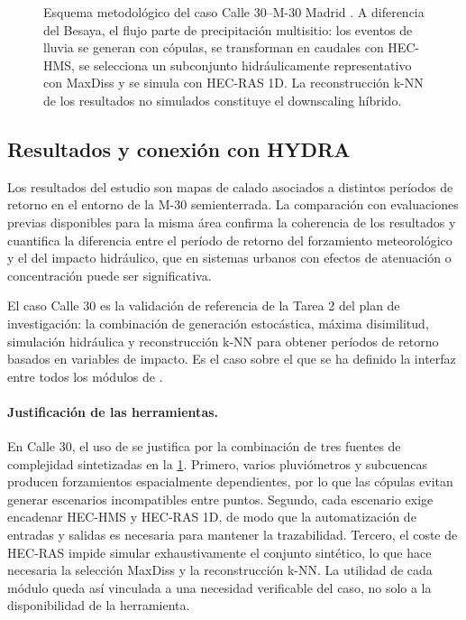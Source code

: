 \begin{figure}[!htbp]
{
}
\caption{Esquema metodológico del caso Calle 30--M-30 Madrid \parencite{navas2024calle30,deljesus2024downscaling}. A diferencia del Besaya, el flujo parte de precipitación multisitio: los eventos de lluvia se generan con cópulas, se transforman en caudales con HEC-HMS, se selecciona un subconjunto hidráulicamente representativo con MaxDiss y se simula con HEC-RAS 1D. La reconstrucción k-NN de los resultados no simulados constituye el downscaling híbrido.}
\label{fig:m30_esquema_precipitacion}
\end{figure}

\subsection{Resultados y conexión con HYDRA}

Los resultados del estudio \parencite{navas2024calle30} son mapas de calado asociados a distintos períodos de retorno en el entorno de la M-30 semienterrada. La comparación con evaluaciones previas disponibles para la misma área confirma la coherencia de los resultados y cuantifica la diferencia entre el período de retorno del forzamiento meteorológico y el del impacto hidráulico, que en sistemas urbanos con efectos de atenuación o concentración puede ser significativa.

El caso Calle 30 es la validación de referencia de la Tarea 2 del plan de investigación: la combinación de generación estocástica, máxima disimilitud, simulación hidráulica y reconstrucción k-NN para obtener períodos de retorno basados en variables de impacto. Es el caso sobre el que se ha definido la interfaz entre todos los módulos de \hydra.

\paragraph{Justificación de las herramientas.}
En Calle 30, el uso de \hydra se justifica por la combinación de tres fuentes de complejidad sintetizadas en la \cref{fig:m30_esquema_precipitacion}. Primero, varios pluviómetros y subcuencas producen forzamientos espacialmente dependientes, por lo que las cópulas evitan generar escenarios incompatibles entre puntos. Segundo, cada escenario exige encadenar HEC-HMS y HEC-RAS 1D, de modo que la automatización de entradas y salidas es necesaria para mantener la trazabilidad. Tercero, el coste de HEC-RAS impide simular exhaustivamente el conjunto sintético, lo que hace necesaria la selección MaxDiss y la reconstrucción k-NN. La utilidad de cada módulo queda así vinculada a una necesidad verificable del caso, no solo a la disponibilidad de la herramienta.

